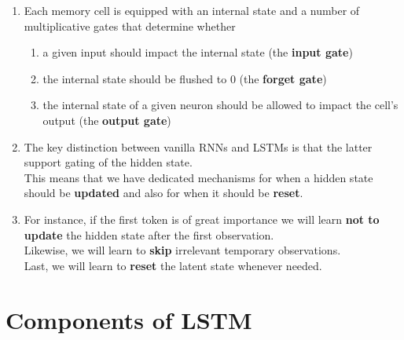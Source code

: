 \begin{enumerate}
    \item Each memory cell is equipped with an internal state and a number of multiplicative gates that determine whether 
    \begin{enumerate}
        \item a given input should impact the internal state (the \textbf{input gate})
        \item the internal state should be flushed to $0$ (the \textbf{forget gate})
        \item the internal state of a given neuron should be allowed to impact the cell’s output (the \textbf{output gate})
    \end{enumerate}

    \item The key distinction between vanilla RNNs and LSTMs is that the latter support gating of the hidden state. \\
    This means that we have dedicated mechanisms for when a hidden state should be \textbf{updated} and also for when it should be \textbf{reset}.

    \item For instance, if the first token is of great importance we will learn \textbf{not to update} the hidden state after the first observation. \\
    Likewise, we will learn to \textbf{skip} irrelevant temporary observations. \\
    Last, we will learn to \textbf{reset} the latent state whenever needed.

\end{enumerate}


\section{Components of LSTM \cite{dnn-1}}

